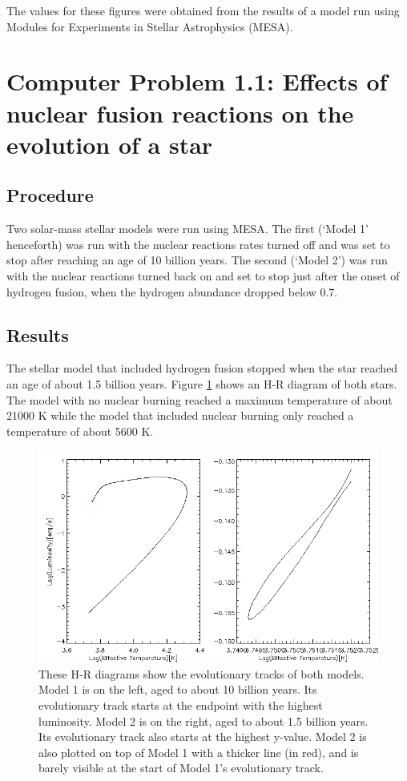 \documentclass{article}
\begin{document}
The values for these figures were obtained from the results of a model 
run using Modules for Experiments in Stellar 
Astrophysics (MESA). 

\newpage


\section{Computer Problem 1.1: Effects of nuclear fusion reactions on
the evolution of a star}

\subsection{Procedure} Two solar-mass stellar models were run using
MESA. The first
(`Model 1' henceforth) was run with the nuclear reactions rates turned
off and was set to stop after reaching an age of 10 billion years. The
second (`Model 2') was run with the nuclear reactions turned back on
and set to stop just after the onset of hydrogen fusion, when the hydrogen
 abundance dropped below 0.7.
	
\subsection{Results} The stellar model that included hydrogen fusion
stopped when the star reached an age of about 1.5 billion years.
Figure \ref{fig2} shows an H-R diagram of both stars.  The model with
no nuclear burning reached a maximum temperature of about 21000 K
while the model that included nuclear burning only reached a 
temperature of about 5600
K. 

\begin{figure}[h] \centering \includegraphics[width=5.0in]{fig2.png}
\caption{These H-R diagrams show the evolutionary tracks of both
models. Model 1 is on the left, aged to about 10 billion years. Its
evolutionary track starts at the endpoint with the highest luminosity.
Model 2 is on the right, aged to about 1.5 billion years. Its 
evolutionary track also starts at the highest
y-value. Model 2 is
also plotted on top of Model 1 with a thicker line (in red), and is
barely visible at the start of Model 1's evolutionary track.}
\label{fig2}
 \end{figure}
	
\end{document}
